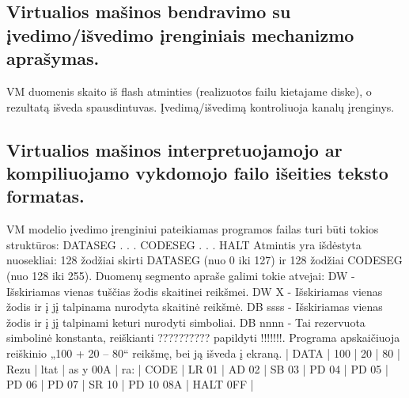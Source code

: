 \documentclass[oneside]{VUMIFPSkursinis}
\begin{document}
\subsection{Virtualios mašinos bendravimo su įvedimo/išvedimo įrenginiais mechanizmo aprašymas.}
VM duomenis skaito iš flash atminties (realizuotos failu kietajame diske), o rezultatą išveda spausdintuvas. Įvedimą/išvedimą kontroliuoja kanalų įrenginys.
\subsection{Virtualios mašinos interpretuojamojo ar kompiliuojamo vykdomojo failo išeities teksto formatas.}
VM modelio įvedimo įrenginiui pateikiamas programos failas turi būti tokios struktūros: \newline
DATASEG\newline
.\newline
.\newline
.\newline
CODESEG\newline
.\newline
.\newline
.\newline
HALT\newline
Atmintis yra išdėstyta nuosekliai: 128 žodžiai skirti DATASEG (nuo 0 iki 127) ir 128 žodžiai\newline
CODESEG (nuo 128 iki 255).\newline
Duomenų segmento apraše galimi tokie atvejai:\newline
DW - Išskiriamas vienas tuščias žodis skaitinei reikšmei.\newline
DW X - Išskiriamas vienas žodis ir į jį talpinama nurodyta skaitinė reikšmė.\newline
DB ssss - Išskiriamas vienas žodis ir į jį talpinami keturi nurodyti simboliai.\newline
DB nnnn - Tai rezervuota simbolinė konstanta, reiškianti ?????????? papildyti !!!!!!!.\newline
Programa apskaičiuoja reiškinio „100 + 20 – 80“ reikšmę, bei ją išveda į ekraną. | DATA | 100 | 20 | 80 | Rezu | ltat | as y\newline
00A | ra: | CODE | LR 01 | AD 02 | SB 03 | PD 04 | PD 05 | PD 06 | PD 07 | SR 10 | PD 10\newline
08A | HALT\newline
0FF |\newline
\end{document}
